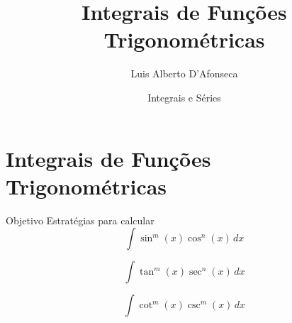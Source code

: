 
\usepackage{apresentacao}
\usepackage{mathconfig}
\usepackage{tabto}
\usepackage{multicol}


\setlength{\parskip}{0.5\baselineskip}

\makeatletter
\graphicspath  {{./figs/}}
\makeatother

\setcounter{exemplo}{0}

\title {Integrais de Funções Trigonométricas}
\author{\large Luis Alberto D'Afonseca}
\date  {Integrais e Séries}



\begin{frame}
    \titlepage
\end{frame}

\section{Integrais de Funções Trigonométricas}

\begin{frame}{Objetivo}
  Estratégias para calcular
  \[\int \sin^m(x) \cos^n(x)\,dx\]

  \[\int \tan^m(x) \sec^n(x)\,dx\]

  \[\int \cot^m(x) \csc^m(x)\,dx\]

\end{frame}

